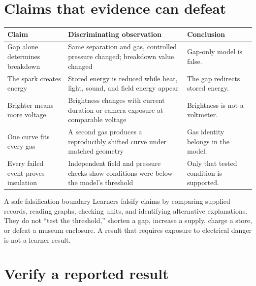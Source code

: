 \section{Claims that evidence can defeat}

\begin{tabularx}{\linewidth}{@{}p{.27\linewidth}p{.34\linewidth}L@{}}
\toprule
\textbf{Claim} & \textbf{Discriminating observation} & \textbf{Conclusion}\\
\midrule
Gap alone determines breakdown & Same separation and gas, controlled pressure
changed; breakdown value changed & Gap-only model is false.\\
The spark creates energy & Stored energy is reduced while heat, light, sound,
and field energy appear & The gap redirects stored energy.\\
Brighter means more voltage & Brightness changes with current duration or
camera exposure at comparable voltage & Brightness is not a voltmeter.\\
One curve fits every gas & A second gas produces a reproducibly shifted curve
under matched geometry & Gas identity belongs in the model.\\
Every failed event proves insulation & Independent field and pressure checks
show conditions were below the model's threshold & Only that tested condition
is supported.\\
\bottomrule
\end{tabularx}

\begin{gate}{A safe falsification boundary}
Learners falsify claims by comparing supplied records, reading graphs, checking
units, and identifying alternative explanations. They do not ``test the
threshold,'' shorten a gap, increase a supply, charge a store, or defeat a
museum enclosure. A result that requires exposure to electrical danger is not
a learner result.
\end{gate}

\section{Verify a reported result}

